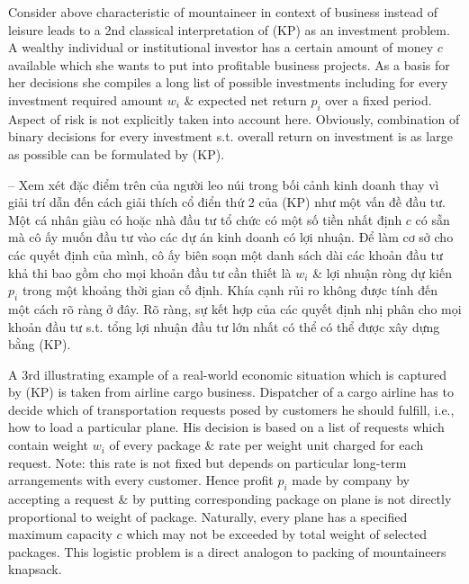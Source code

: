 \documentclass{article}
\begin{document}
\begin{itemize}
\begin{itemize}
        Consider above characteristic of mountaineer in context of business instead of leisure leads to a 2nd classical interpretation of (KP) as an investment problem. A wealthy individual or institutional investor has a certain amount of money $c$ available which she wants to put into profitable business projects. As a basis for her decisions she compiles a long list of possible investments including for every investment required amount $w_i$ \& expected net return $p_i$ over a fixed period. Aspect of risk is not explicitly taken into account here. Obviously, combination of binary decisions for every investment s.t. overall return on investment is as large as possible can be formulated by (KP).
        
        -- Xem xét đặc điểm trên của người leo núi trong bối cảnh kinh doanh thay vì giải trí dẫn đến cách giải thích cổ điển thứ 2 của (KP) như một vấn đề đầu tư. Một cá nhân giàu có hoặc nhà đầu tư tổ chức có một số tiền nhất định $c$ có sẵn mà cô ấy muốn đầu tư vào các dự án kinh doanh có lợi nhuận. Để làm cơ sở cho các quyết định của mình, cô ấy biên soạn một danh sách dài các khoản đầu tư khả thi bao gồm cho mọi khoản đầu tư cần thiết là $w_i$ \& lợi nhuận ròng dự kiến $p_i$ trong một khoảng thời gian cố định. Khía cạnh rủi ro không được tính đến một cách rõ ràng ở đây. Rõ ràng, sự kết hợp của các quyết định nhị phân cho mọi khoản đầu tư s.t. tổng lợi nhuận đầu tư lớn nhất có thể có thể được xây dựng bằng (KP).
        
        A 3rd illustrating example of a real-world economic situation which is captured by (KP) is taken from airline cargo business. Dispatcher of a cargo airline has to decide which of transportation requests posed by customers he should fulfill, i.e., how to load a particular plane. His decision is based on a list of requests which contain weight $w_i$ of every package \& rate per weight unit charged for each request. Note: this rate is not fixed but depends on particular long-term arrangements with every customer. Hence profit $p_i$ made by company by accepting a request \& by putting corresponding package on plane is not directly proportional to weight of package. Naturally, every plane has a specified maximum capacity $c$ which may not be exceeded by total weight of selected packages. This logistic problem is a direct analogon to packing of mountaineers knapsack.
        

\end{itemize}
\end{itemize}
\end{document}
